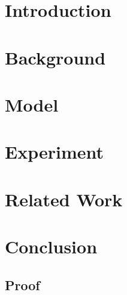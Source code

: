 \documentclass[a4paper, 12pt]{article}
\title{}
\author{
    Tong Cheng \\ \bnu
    \and
    Li Cui \\ \bnu
}
\date{}
\begin{document}
\maketitle
\begin{abstract}
    \lipsum[1]
\end{abstract}

\section{Introduction}
    \lipsum[2]

\section{Background}
    \lipsum[3]

\section{Model}
    \lipsum[4]

\section{Experiment}
    \lipsum[5]

\section{Related Work}
    \lipsum[6]
    \cite{Nobody06}

\section{Conclusion}
    \lipsum[7]




\begin{appendices}
    \section{Proof}
\end{appendices}
\end{document}
